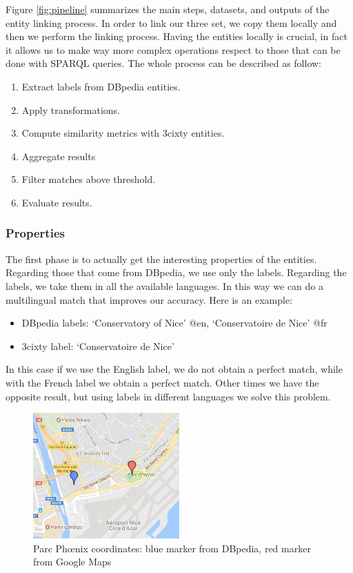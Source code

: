\documentclass[paper=a4, fontsize=11pt]{scrartcl}
\begin{document}
Figure \ref{fig:pipeline} summarizes the main steps, datasets, and outputs of the entity linking process.
In order to link our three set, we copy them locally and then we perform the linking process. Having the entities locally is crucial, in fact it allows us to make way more complex operations respect to those that can be done with SPARQL queries. The whole process can be described as follow:
\begin{enumerate}
\item Extract labels from DBpedia entities.
\item Apply transformations.
\item Compute similarity metrics with 3cixty entities.
\item Aggregate results
\item Filter matches above threshold.
\item Evaluate results.
\end{enumerate}

\subsubsection{Properties}
The first phase is to actually get the interesting properties of the entities. Regarding those that come from DBpedia, we use only the labels. Regarding the labels, we take them in all the available languages. In this way we can do a multilingual match that improves our accuracy. 
Here is an example:
\begin{itemize}
\item DBpedia labels: `Conservatory of Nice' @en, `Conservatoire de Nice' @fr
\item 3cixty label: `Conservatoire de Nice'
\end{itemize}
In this case if we use the English label, we do not obtain a perfect match, while with the French label we obtain a perfect match. Other times we have the opposite result, but using labels in different languages we solve this problem.

\begin{figure}[!htb]
  \centering 
    \includegraphics[width=0.5\textwidth]{images/parc.png}
    \caption{Parc Phœnix coordinates: blue marker from DBpedia, red marker from Google Maps}
    \label{fig:parc}
\end{figure}
\end{document}
